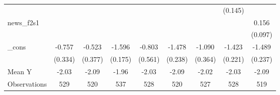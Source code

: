 {\begin{tabular}{l*{8}{c}}
            &                     &                     &                     &                     &                     &                     &     (0.145)         &                     \\
\addlinespace
news\_f2s1   &                     &                     &                     &                     &                     &                     &                     &       0.156         \\
            &                     &                     &                     &                     &                     &                     &                     &     (0.097)         \\
\addlinespace
\_cons      &      -0.757\sym{**} &      -0.523         &      -1.596\sym{***}&      -0.803         &      -1.478\sym{***}&      -1.090\sym{***}&      -1.423\sym{***}&      -1.489\sym{***}\\
            &     (0.334)         &     (0.377)         &     (0.175)         &     (0.561)         &     (0.238)         &     (0.364)         &     (0.221)         &     (0.237)         \\
\midrule
Mean Y      &       -2.03         &       -2.09         &       -1.96         &       -2.03         &       -2.09         &       -2.02         &       -2.03         &       -2.09         \\
Observations&         529         &         520         &         537         &         528         &         520         &         527         &         528         &         519         \\
\bottomrule
\end{tabular}
}
